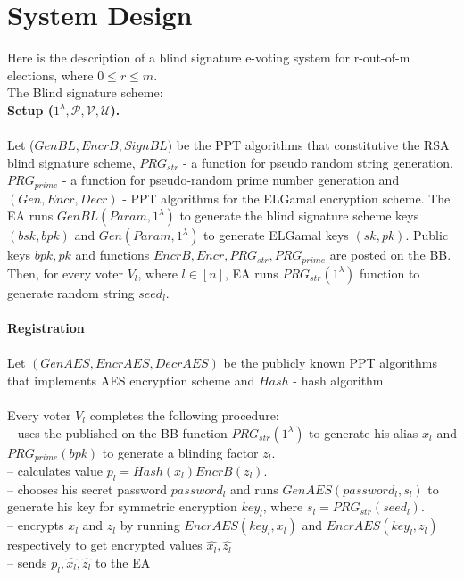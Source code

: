 \section{System Design}
Here is the description of a blind signature e-voting system for r-out-of-m elections, where $0\leq r\leq m$.\\
The Blind signature scheme:\\ 
\textbf{Setup ($1^{\lambda}, \mathcal{P}, \mathcal{V}, \mathcal{U}$).}\\\\
Let ($GenBL, EncrB, SignBL)$ be the PPT algorithms that constitutive the RSA blind signature scheme,  $PRG_{str}$  - a function for pseudo random string generation, $PRG_{prime}$  - a function for pseudo-random prime number generation and $(Gen, Encr, Decr)$ - PPT algorithms for the ELGamal encryption scheme. The EA runs $GenBL(Param, 1^{\lambda})$ to generate the blind signature scheme keys $(bsk, bpk)$ and $Gen(Param, 1^{\lambda})$ to generate ELGamal keys $(sk,pk)$. Public keys $bpk,pk$ and functions $EncrB,Encr, PRG_{str}, PRG_{prime}$ are posted on the BB.\\
Then, for every voter $V_l$, where $l \in [n]$, EA runs $PRG_{str}(1^{\lambda})$ function to generate random string $seed_l$.\\\\
\textbf{Registration}\\\\
Let $(GenAES, EncrAES, DecrAES)$ be the publicly known PPT algorithms that implements AES encryption scheme and $Hash$ - hash algorithm.  \\\\
Every voter $V_l$ completes the following procedure: \\
--  uses the published on the BB function $PRG_{str}(1^{\lambda})$ to generate his alias $x_l$ and  $PRG_{prime}(bpk)$ to generate a blinding factor $z_l$. \\
-- calculates value $p_l = Hash(x_l)EncrB(z_l)$.\\
--  chooses his secret password $password_l$ and runs  $ GenAES(password_l, s_l)$ to generate his key for symmetric encryption $key_l$, where $s_l = PRG_{str}(seed_l)$.\\
--  encrypts $x_l$ and $z_l$ by running  $EncrAES(key_l,x_l)$ and $EncrAES(key_l,z_l)$ respectively to get encrypted values $\hat{x_l},\hat{z_l}$\\
-- sends $p_l,\hat{x_l},\hat{z_l}$ to the EA\\\\
